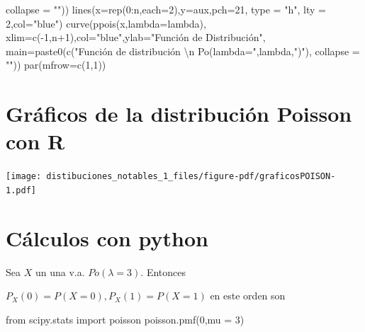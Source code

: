 \documentclass[
  letterpaper,
  DIV=11,
  numbers=noendperiod]{scrreprt}
\newenvironment{Shaded}{\begin{snugshade}}{\end{snugshade}}
\newcommand{\AttributeTok}[1]{\textcolor[rgb]{0.40,0.45,0.13}{#1}}
\newcommand{\DecValTok}[1]{\textcolor[rgb]{0.68,0.00,0.00}{#1}}
\newcommand{\FunctionTok}[1]{\textcolor[rgb]{0.28,0.35,0.67}{#1}}
\newcommand{\ImportTok}[1]{\textcolor[rgb]{0.00,0.46,0.62}{#1}}
\newcommand{\NormalTok}[1]{\textcolor[rgb]{0.00,0.23,0.31}{#1}}
\newcommand{\OperatorTok}[1]{\textcolor[rgb]{0.37,0.37,0.37}{#1}}
\newcommand{\SpecialCharTok}[1]{\textcolor[rgb]{0.37,0.37,0.37}{#1}}
\newcommand{\StringTok}[1]{\textcolor[rgb]{0.13,0.47,0.30}{#1}}
\begin{document}
\begin{Shaded}
\begin{Highlighting}[]
                 \AttributeTok{collapse =} \StringTok{""}\NormalTok{))}
\FunctionTok{lines}\NormalTok{(}\AttributeTok{x=}\FunctionTok{rep}\NormalTok{(}\DecValTok{0}\SpecialCharTok{:}\NormalTok{n,}\AttributeTok{each=}\DecValTok{2}\NormalTok{),}\AttributeTok{y=}\NormalTok{aux,}\AttributeTok{pch=}\DecValTok{21}\NormalTok{, }\AttributeTok{type =} \StringTok{"h"}\NormalTok{, }\AttributeTok{lty =} \DecValTok{2}\NormalTok{,}\AttributeTok{col=}\StringTok{"blue"}\NormalTok{)}
\FunctionTok{curve}\NormalTok{(}\FunctionTok{ppois}\NormalTok{(x,}\AttributeTok{lambda=}\NormalTok{lambda),}
      \AttributeTok{xlim=}\FunctionTok{c}\NormalTok{(}\SpecialCharTok{{-}}\DecValTok{1}\NormalTok{,n}\SpecialCharTok{+}\DecValTok{1}\NormalTok{),}\AttributeTok{col=}\StringTok{"blue"}\NormalTok{,}\AttributeTok{ylab=}\StringTok{"Función de Distribución"}\NormalTok{,}
      \AttributeTok{main=}\FunctionTok{paste0}\NormalTok{(}\FunctionTok{c}\NormalTok{(}\StringTok{"Función de distribución }\SpecialCharTok{\textbackslash{}n}\StringTok{ Po(lambda="}\NormalTok{,lambda,}\StringTok{")"}\NormalTok{),}
                  \AttributeTok{collapse =} \StringTok{""}\NormalTok{))}
\FunctionTok{par}\NormalTok{(}\AttributeTok{mfrow=}\FunctionTok{c}\NormalTok{(}\DecValTok{1}\NormalTok{,}\DecValTok{1}\NormalTok{))}
\end{Highlighting}
\end{Shaded}

\section{Gráficos de la distribución Poisson con
R}\label{gruxe1ficos-de-la-distribuciuxf3n-poisson-con-r-1}

\begin{center}
\texttt{[image: distibuciones\_notables\_1\_files/figure-pdf/graficosPOISON-1.pdf]}
\end{center}

\section{Cálculos con python}\label{cuxe1lculos-con-python-4}

Sea \(X\) un una v.a. \(Po(\lambda=3)\). Entonces

\(P_X(0)=P(X=0), P_X(1)=P(X=1)\) en este orden son

\begin{Shaded}
\begin{Highlighting}[]
\ImportTok{from}\NormalTok{ scipy.stats }\ImportTok{import}\NormalTok{ poisson}
\NormalTok{poisson.pmf(}\DecValTok{0}\NormalTok{,mu }\OperatorTok{=} \DecValTok{3}\NormalTok{)}
\end{Highlighting}
\end{Shaded}
\end{document}
